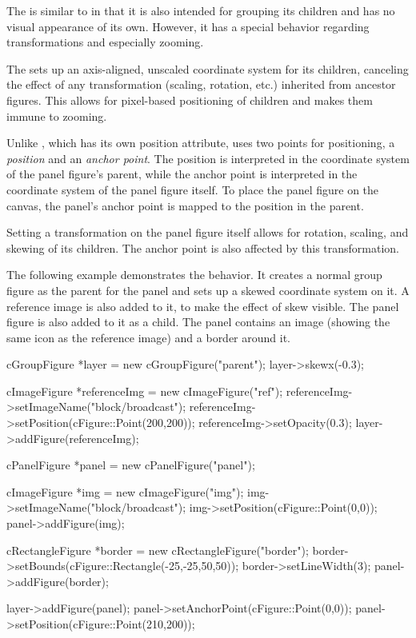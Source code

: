 The  is similar to  in that it is also
intended for grouping its children and has no visual appearance of its own.
However, it has a special behavior regarding transformations and especially zooming.

The  sets up an axis-aligned, unscaled coordinate system for
its children, canceling the effect of any transformation (scaling, rotation,
etc.) inherited from ancestor figures. This allows for pixel-based positioning
of children and makes them immune to zooming.

Unlike , which has its own position attribute,
 uses two points for positioning, a \textit{position} and
an \textit{anchor point}. The position is interpreted in the coordinate system of
the panel figure's parent, while the anchor point is interpreted in the
coordinate system of the panel figure itself. To place the panel figure on the
canvas, the panel's anchor point is mapped to the position in the parent.

Setting a transformation on the panel figure itself allows for rotation,
scaling, and skewing of its children. The anchor point is also affected by this
transformation.

The following example demonstrates the  behavior. It
creates a normal group figure as the parent for the panel and sets up a
skewed coordinate system on it. A reference image is also added to it,
to make the effect of skew visible. The panel figure is also
added to it as a child. The panel contains an image (showing the same icon
as the reference image) and a border around it.

\begin{cpp}
cGroupFigure *layer = new cGroupFigure("parent");
layer->skewx(-0.3);

cImageFigure *referenceImg = new cImageFigure("ref");
referenceImg->setImageName("block/broadcast");
referenceImg->setPosition(cFigure::Point(200,200));
referenceImg->setOpacity(0.3);
layer->addFigure(referenceImg);

cPanelFigure *panel = new cPanelFigure("panel");

cImageFigure *img = new cImageFigure("img");
img->setImageName("block/broadcast");
img->setPosition(cFigure::Point(0,0));
panel->addFigure(img);

cRectangleFigure *border = new cRectangleFigure("border");
border->setBounds(cFigure::Rectangle(-25,-25,50,50));
border->setLineWidth(3);
panel->addFigure(border);

layer->addFigure(panel);
panel->setAnchorPoint(cFigure::Point(0,0));
panel->setPosition(cFigure::Point(210,200));
\end{cpp}

